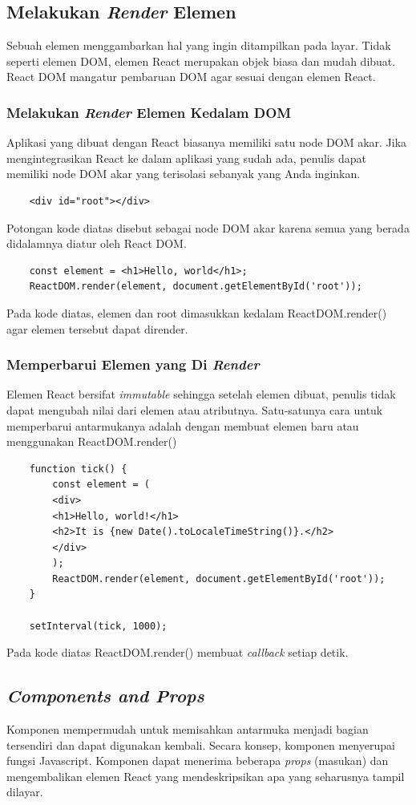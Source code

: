 \subsection{Melakukan \textit{Render} Elemen}
Sebuah elemen menggambarkan hal yang ingin ditampilkan pada layar. Tidak seperti elemen DOM, elemen React merupakan objek biasa dan mudah dibuat. React DOM mangatur pembaruan DOM agar sesuai dengan elemen React.
\subsubsection{Melakukan \textit{Render} Elemen Kedalam DOM}
Aplikasi yang dibuat dengan React biasanya memiliki satu node DOM akar. Jika mengintegrasikan React ke dalam aplikasi yang sudah ada, penulis dapat memiliki node DOM akar yang terisolasi sebanyak yang Anda inginkan.
\begin{lstlisting}
	<div id="root"></div>
\end{lstlisting}
Potongan kode diatas disebut sebagai node DOM akar karena semua yang berada didalamnya diatur oleh React DOM.
\begin{lstlisting}
	const element = <h1>Hello, world</h1>;
	ReactDOM.render(element, document.getElementById('root'));
\end{lstlisting}
Pada kode diatas, elemen dan root dimasukkan kedalam ReactDOM.render() agar elemen tersebut dapat dirender.
\subsubsection{Memperbarui Elemen yang Di \textit{Render}}
Elemen React bersifat \textit{immutable} sehingga setelah elemen dibuat, penulis tidak dapat mengubah nilai dari elemen atau atributnya. Satu-satunya cara untuk memperbarui antarmukanya adalah dengan membuat elemen baru atau menggunakan ReactDOM.render()
\begin{lstlisting}
	function tick() {
		const element = (
		<div>
		<h1>Hello, world!</h1>
		<h2>It is {new Date().toLocaleTimeString()}.</h2>
		</div>
		);
		ReactDOM.render(element, document.getElementById('root'));
	}
	
	setInterval(tick, 1000);
\end{lstlisting}
Pada kode diatas ReactDOM.render() membuat \textit{callback} setiap detik.

\subsection{\textit{Components and Props}}
Komponen mempermudah untuk memisahkan antarmuka menjadi bagian tersendiri dan dapat digunakan kembali. Secara konsep, komponen menyerupai fungsi Javascript. Komponen dapat menerima beberapa \textit{props} (masukan) dan mengembalikan elemen React yang mendeskripsikan apa yang seharusnya tampil dilayar. 
